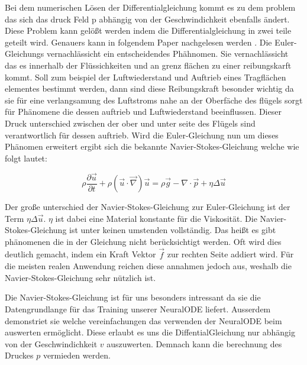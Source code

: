 Bei dem numerischen Lösen der Differentialgleichung kommt es zu dem problem das sich das druck Feld p
abhängig von der Geschwindichkeit ebenfalls ändert.
Diese Problem kann gelößt werden indem die Differentialgleichung in zwei teile geteilt wird.
Genauers kann in folgendem Paper nachgelesen werden \cite{num_navier}.
Die Euler-Gleichungs vernachlässicht ein entscheidendes Phähnomen.
Sie vernachlässicht das es innerhalb der Flüssichkeiten und an grenz flächen zu einer reibungskarft kommt.
Soll zum beispiel der Luftwiederstand und Auftrieb eines Tragflächen elementes bestimmt werden,
dann sind diese Reibungskraft besonder wichtig da sie für eine verlangsamung des Luftstroms nahe an der Oberfäche
des flügels sorgt für Phänomene die dessen auftrieb und Luftwiederstand beeinflussen.
Dieser Druck unterschied zwischen der ober und unter seite des Flügels sind verantwortlich für dessen auftrieb.
Wird die Euler-Gleichung nun um dieses Phänomen erweitert ergibt sich die bekannte Navier-Stokes-Gleichung \cite[Kapitel~1.4]{navier_stokes} 
welche wie folgt lautet:

$$
\rho \frac{\partial \vec{u}}{\partial t} + \rho (\vec{u} \cdot \vec{\nabla} ) \vec{u} = 
\rho \vec{g} - \nabla \cdot \vec{p} + \eta \Delta \vec{u}
$$

Der große unterschied der Navier-Stokes-Gleichung zur Euler-Gleichung ist der Term $\eta \Delta \vec{u}$.
$\eta$ ist dabei eine Material konstante für die Viskosität.
Die Navier-Stokes-Gleichung ist unter keinen umstenden vollständig.
Das heißt es gibt phänomenen die in der Gleichung nicht berücksichtigt werden.
Oft wird dies deutlich gemacht, indem ein Kraft Vektor $\vec{f}$ zur rechten Seite addiert wird.
Für die meisten realen Anwendung reichen diese annahmen jedoch aus, weshalb die Navier-Stokes-Gleichung sehr nützlich ist.

Die Navier-Stokes-Gleichung ist für uns besonders intressant da sie die Datengrundlange für das Training unserer NeuralODE liefert.
Ausserdem demonstriet sie welche vereinfachungen das verwenden der NeuralODE beim auswerten ermöglicht.
Diese erlaubt es uns die DiffentialGleichung nur abhängig von der Geschwindichkeit $v$ auszuwerten.
Demnach kann die berechnung des Druckes $p$ vermieden werden.

